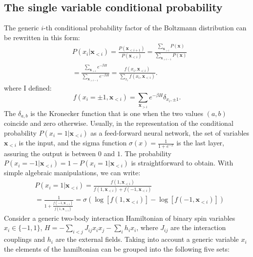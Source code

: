 \documentclass[aps,physrev,10pt,floatfix,reprint]{revtex4-2}
\begin{document}
\subsection{The single variable conditional probability}
The generic $i$-th conditional probability factor of the Boltzmann distribution can be rewritten in this form: 
\begin{equation}
    \label{eq:chain}
    \begin{split}
    & P\left(x_{i}|\mathbf{x}_{<i}\right)  = 
    \frac{P\left(\mathbf{x}_{<i+1}\right)}{P\left(\mathbf{x}_{<i}\right)}  = 
    \frac{\sum_{\mathbf{x}_{>i}}P\left(\mathbf{x}\right)}{\sum_{\mathbf{x}_{>i-1}}P\left(\mathbf{x}\right)} \\
    &=\frac{\sum_{\mathbf{x}_{>i}}e^{-\beta H}}{\sum_{\mathbf{x}_{>i-1}}e^{-\beta H}}  = 
    \frac{f\left(x_{i},\mathbf{x}_{<i}\right)}{\sum_{x_{i}}f\left(x_{i},\mathbf{x}_{<i}\right)}.
    \end{split}
\end{equation}
where I defined: 
\begin{equation}
f\left(x_{i}=\pm 1,\mathbf{x}_{<i}\right) = \sum_{\mathbf{x}_{>i}}e^{-\beta H}\delta_{x_i, \pm1}.  
\end{equation}
The $\delta_{a,b}$ is the Kronecker function that is one when the two values $(a,b)$ coincide and zero otherwise. Usually, in the representation of the conditional probability $P\left(x_{i}=1|\mathbf{x}_{<i}\right)$ as a feed-forward neural network, the set of variables $\mathbf{x}_{<i}$ is the input, and the sigma function $\sigma(x)=\frac{1}{1+e^{-x}}$ is the last layer, assuring the output is between $0$ and $1$. The probability $P\left(x_{i}=-1|\mathbf{x}_{<i}\right) = 1 - P\left(x_{i}=1|\mathbf{x}_{<i}\right)$ is straightforward to obtain. With simple algebraic manipulations, we can write: 
\begin{equation}
    \label{eq:sigma_log}
    \begin{split}
    & P\left(x_{i}=1|\mathbf{x}_{<i}\right) = 
    \frac{f\left(1,\mathbf{x}_{<i}\right)}{ f\left(1,\mathbf{x}_{<i}\right) + f\left(-1,\mathbf{x}_{<i}\right)} \\
    &=  \frac{1}{ 1 + \frac{f\left(-1,\mathbf{x}_{<i}\right)}{f\left(1,\mathbf{x}_{<i}\right)}}  = \sigma\left(\log\left[f\left(1,\mathbf{x}_{<i}\right)\right]-\log\left[f\left(-1,\mathbf{x}_{<i}\right)\right]\right)
    \end{split}
\end{equation}
Consider a generic two-body interaction Hamiltonian of binary spin variables $x_i \in \{-1,1\}$, $H = -\sum_{i<j} J_{ij} x_i x_j - \sum_{i} h_i x_i$, where $J_{ij}$ are the interaction couplings and $h_i$ are the external fields. Taking into account a generic variable $x_i$ the elements of the hamiltonian can be grouped into the following five sets:
\end{document}
